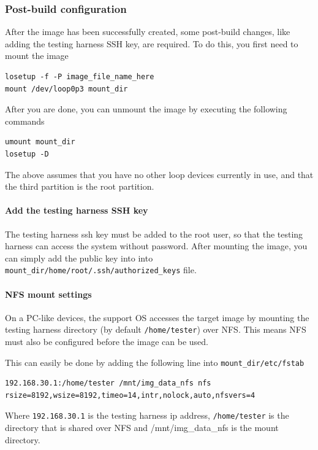 \documentclass[a4paper,11pt]{article}
\newcommand{\cmd}[1]{\texttt{#1}}
\begin{document}
\subsubsection*{Post-build configuration}

After the image has been successfully created, some post-build changes, like adding the testing harness SSH key, are required. To do this, you first need to mount the image

\begin{lstlisting}
losetup -f -P image_file_name_here
mount /dev/loop0p3 mount_dir
\end{lstlisting}

After you are done, you can unmount the image by executing the following commands

\begin{lstlisting}
umount mount_dir
losetup -D
\end{lstlisting}

The above assumes that you have no other loop devices currently in use, and that the third partition is the root partition.

\paragraph*{Add the testing harness SSH key}

The testing harness ssh key must be added to the root user, so that the testing harness can access the system without password. After mounting the image, you can simply add the public key into into \cmd{mount\_dir/home/root/.ssh/authorized\_keys} file.

\paragraph*{NFS mount settings}

On a PC-like devices, the support OS accesses the target image by mounting the testing harness directory (by default \cmd{/home/tester}) over NFS. This means NFS must also be configured before the image can be used.

This can easily be done by adding the following line into \cmd{mount\_dir/etc/fstab}

\begin{lstlisting}
192.168.30.1:/home/tester /mnt/img_data_nfs nfs rsize=8192,wsize=8192,timeo=14,intr,nolock,auto,nfsvers=4
\end{lstlisting}

Where \cmd{192.168.30.1} is the testing harness ip address, \cmd{/home/tester} is the directory that is shared over NFS and {/mnt/img\_data\_nfs} is the mount directory.
\end{document}
